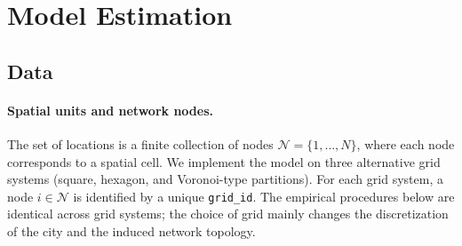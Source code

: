 \documentclass[12pt]{article}
\begin{document}
	
	\clearpage
	\section{Model Estimation}
	
	\subsection{Data}
	\paragraph{Spatial units and network nodes.} The set of locations is a finite collection of nodes $\mathcal N=\{1,\dots,N\}$, where each node corresponds to a spatial cell. We implement the model on three alternative grid systems (square, hexagon, and Voronoi-type partitions). For each grid system, a node $i\in\mathcal N$ is identified by a unique \texttt{grid\_id}. The empirical procedures below are identical across grid systems; the choice of grid mainly changes the discretization of the city and the induced network topology.
	
\end{document}
